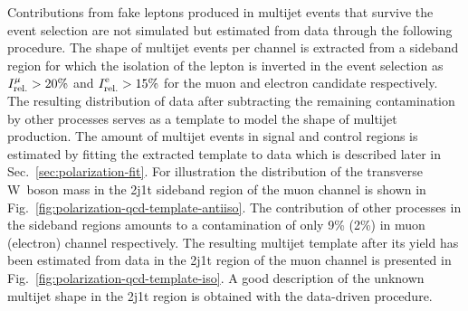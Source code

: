 
Contributions from fake leptons produced in multijet events that survive the event selection are not simulated but estimated from data through the following procedure. The shape of multijet events per channel is extracted from a sideband region for which the isolation of the lepton is inverted in the event selection as $\muiso>20\%$ and $\eiso>15\%$ for the muon and electron candidate respectively. The resulting distribution of data after subtracting the remaining contamination by other processes serves as a template to model the shape of multijet production. The amount of multijet events in signal and control regions is estimated by fitting the extracted template to data which is described later in Sec.~\ref{sec:polarization-fit}. For illustration the distribution of the transverse W~boson mass in the 2j1t sideband region of the muon channel is shown in Fig.~\ref{fig:polarization-qcd-template-antiiso}. The contribution of other processes in the sideband regions amounts to a contamination of only 9\% (2\%) in muon (electron) channel respectively. The resulting multijet template after its yield has been estimated from data in the 2j1t region of the muon channel is presented in Fig.~\ref{fig:polarization-qcd-template-iso}. A good description of the unknown multijet shape in the 2j1t region is obtained with the data-driven procedure.

